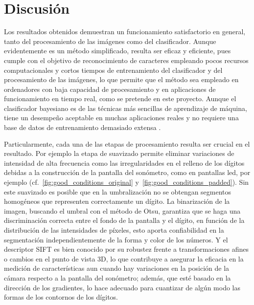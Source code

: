 \section*{Discusión}
Los resultados obtenidos demuestran un funcionamiento satisfactorio en general, tanto del procesamiento de las imágenes como del clasificador.
Aunque evidentemente es un método simplificado, resulta ser eficaz y eficiente, pues cumple con el objetivo de reconocimiento de caracteres empleando pocos recursos computacionales y cortos tiempos de entrenamiento del clasificador y del procesamiento de las imágenes, lo que permite que el método sea empleado en ordenadores con baja capacidad de procesamiento y en aplicaciones de funcionamiento en tiempo real, como se pretende en este proyecto.
Aunque el clasificador bayesiano es de las técnicas más sencillas de aprendizaje de máquina, tiene un desempeño aceptable en muchas aplicaciones reales y no requiere una base de datos de entrenamiento demasiado extensa .

Particularmente, cada una de las etapas de procesamiento resulta ser crucial en el resultado.
Por ejemplo la etapa de suavizado permite eliminar variaciones de intensidad de alta frecuencia como las irregularidades en el relleno de los dígitos debidas a la construcción de la pantalla del sonómetro, como en pantallas led, por ejemplo (cf.~\ref{fig:good_conditions_original} y~\ref{fig:good_conditions_padded}).
Sin este suavizado es posible que en la umbralización no se obtengan segmentos homogéneos que representen correctamente un dígito.
La binarización de la imagen, buscando el umbral con el método de Otsu, garantiza que se haga una discriminación correcta entre el fondo de la pantalla y el dígito, en función de la distribución de las intensidades de píxeles, esto aporta confiabilidad en la segmentación independientemente de la forma y color de los números.
Y el descriptor SIFT es bien conocido por su robustez frente a transformaciones afines o cambios en el punto de vista 3D, lo que contribuye a asegurar la eficacia en la medición de características aun cuando hay variaciones en la posición de la cámara respecto a la pantalla del sonómetro;
además, que esté basado en la dirección de los gradientes, lo hace adecuado para cuantizar de algún modo las formas de los contornos de los dígitos.

